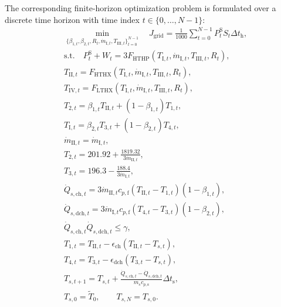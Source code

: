 \documentclass[12pt]{article}
\begin{document}
The corresponding finite-horizon optimization problem is formulated over a discrete time horizon with time index $t \in \{0,\ldots,N-1\}$:
\begingroup
\allowdisplaybreaks[1]
\begin{align}
&\min_{\{\beta_{1,t},\beta_{2,t},R_t,\dot{m}_{\mathrm{I},t},T_{\mathrm{III},t}\}_{t=0}^{N-1}}
\quad J_{\mathrm{grid}} = \frac{1}{1000}\sum_{t=0}^{N-1} P_t^{\mathrm S} S_t \Delta t_{\mathrm h},
\label{eq:cookie_objective} \\
&\text{s.t.} \quad P_t^{\mathrm S} + W_t = 3F_{\mathrm{HTHP}}\left(T_{\mathrm{I},t},\dot{m}_{\mathrm{I},t},T_{\mathrm{III},t},R_t\right), \label{eq:cookie_power_balance} \\
&T_{\mathrm{II},t} = F_{\mathrm{HTHX}}\left(T_{\mathrm{I},t},\dot{m}_{\mathrm{I},t},T_{\mathrm{III},t},R_t\right), \\
&T_{\mathrm{IV},t} = F_{\mathrm{LTHX}}\left(T_{\mathrm{I},t},\dot{m}_{\mathrm{I},t},T_{\mathrm{III},t},R_t\right), \\
&T_{2,t} = \beta_{1,t} T_{\mathrm{II},t} + \left(1-\beta_{1,t}\right)T_{1,t}, \label{eq:cookie_charging_coupling} \\
&T_{\mathrm{I},t} = \beta_{2,t} T_{3,t} + \left(1-\beta_{2,t}\right)T_{4,t}, \label{eq:cookie_discharging_mixing} \\
&\dot{m}_{\mathrm{II},t} = \dot{m}_{\mathrm{I},t}, \\
&T_{2,t} = 201.92 + \frac{1819.32}{3\dot{m}_{\mathrm{II},t}}, \\
&T_{3,t} = 196.3 - \frac{188.4}{3\dot{m}_{\mathrm{I},t}}, \\
&\dot{Q}_{s,\mathrm{ch},t} = 3\dot{m}_{\mathrm{II},t} c_{p,\mathrm{f}}\left(T_{\mathrm{II},t}-T_{1,t}\right)\left(1-\beta_{1,t}\right), \\
&\dot{Q}_{s,\mathrm{dch},t} = 3\dot{m}_{\mathrm{I},t} c_{p,\mathrm{f}}\left(T_{4,t}-T_{3,t}\right)\left(1-\beta_{2,t}\right), \\
&\dot{Q}_{s,\mathrm{ch},t} \dot{Q}_{s,\mathrm{dch},t} \leq \gamma, \\
&T_{1,t} = T_{\mathrm{II},t} - \epsilon_{\mathrm{ch}}\left(T_{\mathrm{II},t}-T_{s,t}\right), \\
&T_{4,t} = T_{3,t} - \epsilon_{\mathrm{dch}}\left(T_{3,t}-T_{s,t}\right), \\
&T_{s,t+1} = T_{s,t} + \frac{\dot{Q}_{s,\mathrm{ch},t}-\dot{Q}_{s,\mathrm{dch},t}}{m_s c_{p,\mathrm{s}}}\Delta t_{\mathrm s}, \\
&T_{s,0} = \tilde{T}_0, \qquad T_{s,N} = T_{s,0}.
\end{align}
\end{document}
